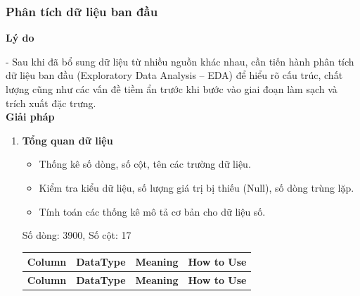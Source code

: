    \subsubsection{Phân tích dữ liệu ban đầu}
    
    \textbf{Lý do} 
    
    - Sau khi đã bổ sung dữ liệu từ nhiều nguồn khác nhau, cần tiến hành phân tích dữ liệu ban đầu (Exploratory Data Analysis – EDA) 
    để hiểu rõ cấu trúc, chất lượng cũng như các vấn đề tiềm ẩn trước khi bước vào giai đoạn làm sạch và trích xuất đặc trưng. \\
    
    \textbf{Giải pháp} 
    
    \begin{enumerate}[label=\arabic*]
        \item \textbf{Tổng quan dữ liệu}
        \begin{itemize}
            \item Thống kê số dòng, số cột, tên các trường dữ liệu.
            \item Kiểm tra kiểu dữ liệu, số lượng giá trị bị thiếu (Null), số dòng trùng lặp.
            \item Tính toán các thống kê mô tả cơ bản cho dữ liệu số.
    \end{itemize}
     Số dòng: 3900, Số cột: 17
    \begin{longtable}{|>{\raggedright\arraybackslash}p{2.8cm}|
                          >{\raggedright\arraybackslash}p{2cm}|
                          >{\raggedright\arraybackslash}p{6cm}|
                          >{\raggedright\arraybackslash}p{5cm}|}
        \hline
        \textbf{Column} & \textbf{DataType} & \textbf{Meaning} & \textbf{How to Use} \\ \hline
        \endfirsthead
        
        \hline
        \textbf{Column} & \textbf{DataType} & \textbf{Meaning} & \textbf{How to Use} \\ \hline
        \endhead
        

\end{longtable}
\end{enumerate}
